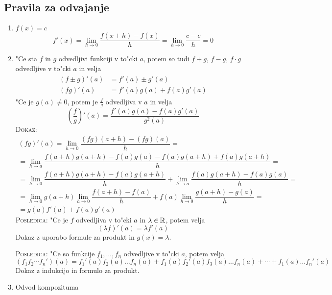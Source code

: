 \subsection{Pravila za odvajanje}
\begin{enumerate}
\item
$f(x) = c$
\begin{equation*}
f'(x) = \lim_{h \to 0} \dfrac{f(x + h) - f(x)}{h} = \lim_{h \to 0} \dfrac{c - c}{h} = 0
\end{equation*}
\item 
"Ce sta $f$ in $g$ odvedljivi funkciji v to"cki $a$, potem so tudi $f + g$, $f - g$, $f \cdot g$ odvedljive v to"cki $a$ in velja
\begin{gather*}
\begin{aligned}
(f \pm g)' (a) &= f'(a) \pm g'(a) \\
(f g)'(a) &= f'(a) g(a) + f(a)g'(a)
\end{aligned}
\end{gather*}
"Ce je $g(a) \neq 0$, potem je $\frac{f}{g}$ odvedljiva v $a$ in velja
\begin{equation*}
\left(\dfrac{f}{g}\right)'(a) = \dfrac{f'(a) g(a) - f(a)g'(a)}{g^2(a)}
\end{equation*}
\textsc{Dokaz:}
\begin{multline*}
(fg)'(a) = \lim_{h \to 0} \dfrac{(fg)(a + h) - (fg)(a)}{h} = \\
= \lim_{h \to a} \dfrac{f(a + h)g(a+h) - f(a)g(a) - f(a)g(a+h) + f(a)g(a+h)}{h} = \\
= \lim_{h \to 0} \dfrac{f(a+h)g(a+h)-f(a)g(a+h)}{h} + \lim_{h \to a}\dfrac{f(a)g(a+h) - f(a)g(a)}{h} = \\
=\lim_{h \to 0} g(a+h) \lim_{h \to 0} \dfrac{f(a+h)-f(a)}{h} + f(a)\lim_{h \to 0}\dfrac{g(a+h) - g(a)}{h} = \\
= g(a)f'(a) + f(a)g'(a)
\end{multline*}
\textsc{Posledica:} "Ce je $f$ odvedljiva v to"cki $a$ in $\lambda \in \mathbb{R}$, potem velja
\begin{equation*}
(\lambda f)'(a) = \lambda f'(a)
\end{equation*}
Dokaz z uporabo formule za produkt in $g(x) = \lambda$.

\textsc{Posledica:} "Ce so funkcije $f_1, \ldots, f_n$ odvedljive v to"cki $a$, potem velja
\begin{equation*}
(f_1 f_2 \cdots f_n') (a) = f_1'(a) f_2(a)\ldots f_n(a) + f_1(a)f_2'(a) f_3(a)\ldots f_n(a) + \cdots + f_1(a) \ldots f_n'(a)
\end{equation*}
Dokaz z indukcijo in formulo za produkt.
\item Odvod kompozituma


\end{enumerate}
